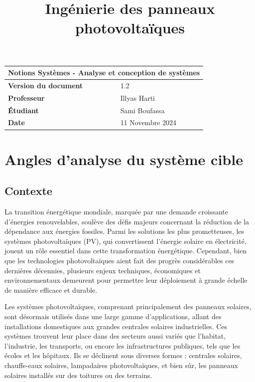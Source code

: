 \documentclass{article}
\title{Ingénierie des panneaux photovoltaïques}
\author{}
\date{\vspace{-5ex}}
\begin{document}
\maketitle

\begin{center}
    \begin{tabular}{|l|l|}
        \hline
        \multicolumn{2}{|c|}{\textbf{Notions Systèmes - Analyse et conception de systèmes}} \\
        \hline
        \textbf{Version du document} & 1.2 \\
        \hline
        \textbf{Professeur} & Illyas Harti\\
        \hline
        \textbf{Étudiant} & Sami Boufassa\\
                            
        \hline
        \textbf{Date} & 11 Novembre 2024 \\
        \hline
    \end{tabular}
\end{center}

\tableofcontents

\newpage

\section{Angles d'analyse du système cible}
\subsection{Contexte}
La transition énergétique mondiale, marquée par une demande croissante d'énergies renouvelables, soulève des défis majeurs concernant la réduction de la dépendance aux énergies fossiles. Parmi les solutions les plus prometteuses, les systèmes photovoltaïques (PV), qui convertissent l'énergie solaire en électricité, jouent un rôle essentiel dans cette transformation énergétique. Cependant, bien que les technologies photovoltaïques aient fait des progrès considérables ces dernières décennies, plusieurs enjeux techniques, économiques et environnementaux demeurent pour permettre leur déploiement à grande échelle de manière efficace et durable.

Les systèmes photovoltaïques, comprenant principalement des panneaux solaires, sont désormais utilisés dans une large gamme d'applications, allant des installations domestiques aux grandes centrales solaires industrielles. Ces systèmes trouvent leur place dans des secteurs aussi variés que l'habitat, l'industrie, les transports, ou encore les infrastructures publiques, tels que les écoles et les hôpitaux. Ils se déclinent sous diverses formes : centrales solaires, chauffe-eaux solaires, lampadaires photovoltaïques, et bien sûr, les panneaux solaires installés sur des toitures ou des terrains.
\end{document}
